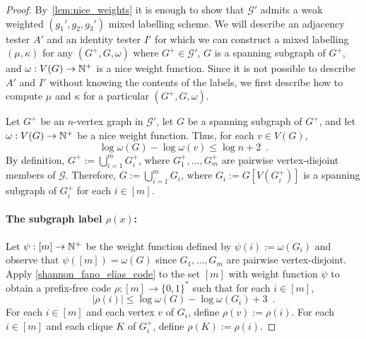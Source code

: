 \documentclass{patmorin}
\renewcommand{\le}{\leqslant}
\begin{document}
\begin{proof}
  By~\cref{lem:nice_weights} it is enough to show that $\mathcal{G}'$ admits a weak weighted $(g_1',g_2,g_3')$ mixed labelling scheme. We will describe an adjacency tester $A'$ and an identity tester $I'$ for which we can construct a mixed labelling $(\mu,\kappa)$ for any $(G^+,G,\omega)$ where $G^+\in\mathcal{G}'$, $G$ is a spanning subgraph of $G^+$, and $\omega:V(G)\to\mathbb{N}^+$ is a nice weight function.
  Since it is not possible to describe $A'$ and $I'$ without knowing the contents of the labels, we first describe how to compute $\mu$ and $\kappa$ for a particular $(G^+,G,\omega)$.

  Let $G^+$ be an $n$-vertex graph in $\mathcal{G}'$, let $G$ be a spanning subgraph of $G^+$, and let $\omega:V(G)\to\mathbb{N}^+$ be a nice weight function.
  Thus, for each $v\in V(G)$,
  \begin{equation}
    \label{eq:nice}
    \log\omega(G)-\log\omega(v)\le\log n + 2\enspace.
  \end{equation}
  By definition, $G^+:=\bigcup_{i=1}^m G^+_i$, where $G^+_1,\ldots,G^+_m$ are pairwise vertex-disjoint members of $\mathcal{G}$.
  Therefore, $G:=\bigcup_{i=1}^m G_i$, where $G_i:=G[V(G^+_i)]$ is a spanning subgraph of $G^+_i$ for each $i\in[m]$.

  \paragraph{\boldmath The subgraph label $\rho(x)$:}
  Let $\psi:[m]\to\mathbb{N}^+$ be the weight function defined by $\psi(i):=\omega(G_i)$ and observe that $\psi([m])=\omega(G)$ since $G_1,\ldots,G_m$ are pairwise vertex-disjoint.
  Apply \cref{shannon_fano_elias_code} to the set $[m]$ with weight function $\psi$ to obtain a prefix-free code $\rho:[m]\to\{0,1\}^*$ such that for each $i\in[m]$,
  \begin{equation}
    \label{eq:pi}
    |\rho(i)|\le\log \omega(G)-\log \omega(G_i)+3\enspace.
  \end{equation}
  For each $i\in[m]$ and each vertex $v$ of $G_i$, define $\rho(v):=\rho(i)$. For each $i\in[m]$ and each clique $K$ of $G^+_i$, define $\rho(K):=\rho(i)$.


\end{proof}
\end{document}
